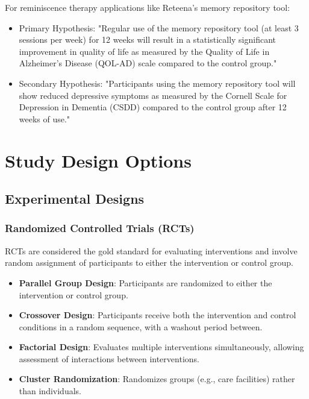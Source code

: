 \begin{tcolorbox}[infobox, title=Example Hypotheses for Reminiscence Therapy Applications]
For reminiscence therapy applications like Reteena's memory repository tool:
\begin{itemize}
    \item Primary Hypothesis: "Regular use of the memory repository tool (at least 3 sessions per week) for 12 weeks will result in a statistically significant improvement in quality of life as measured by the Quality of Life in Alzheimer's Disease (QOL-AD) scale compared to the control group."
    
    \item Secondary Hypothesis: "Participants using the memory repository tool will show reduced depressive symptoms as measured by the Cornell Scale for Depression in Dementia (CSDD) compared to the control group after 12 weeks of use."
\end{itemize}
\end{tcolorbox}

\section{Study Design Options}
\subsection{Experimental Designs}
\subsubsection{Randomized Controlled Trials (RCTs)}
RCTs are considered the gold standard for evaluating interventions and involve random assignment of participants to either the intervention or control group.

\begin{itemize}
    \item \textbf{Parallel Group Design}: Participants are randomized to either the intervention or control group.
    \item \textbf{Crossover Design}: Participants receive both the intervention and control conditions in a random sequence, with a washout period between.
    \item \textbf{Factorial Design}: Evaluates multiple interventions simultaneously, allowing assessment of interactions between interventions.
    \item \textbf{Cluster Randomization}: Randomizes groups (e.g., care facilities) rather than individuals.
\end{itemize}

